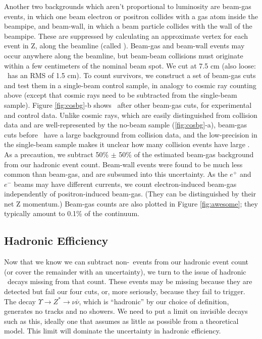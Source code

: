 \documentclass[aps,prd,preprint,superscriptaddress,tightenlines,nofootinbib,floatfix]{revtex4}
\begin{document}
Another two backgrounds which aren't proportional to luminosity are
beam-gas events, in which one beam electron or positron collides with
a gas atom inside the beampipe, and beam-wall, in which a beam
particle collides with the wall of the beampipe.  These are suppressed
by calculating an approximate vertex for each event in Z, along the
beamline (called \dz).  Beam-gas and beam-wall events may occur
anywhere along the beamline, but beam-beam collisions must originate
within a few centimeters of the nominal beam spot.  We cut at 7.5 cm
(also loose: \dz\ has an RMS of 1.5 cm).  To count survivors, we
construct a set of beam-gas cuts and test them in a single-beam
control sample, in analogy to cosmic ray counting above (except that
cosmic rays need to be subtracted from the single-beam sample).
Figure \ref{fig:cosbg}-b shows \dz\ after other beam-gas cuts, for
experimental and control data.  Unlike cosmic rays, which are easily
distinguished from collision data and are well-represented by the
no-beam sample (\ref{fig:cosbg}-a), beam-gas cuts before \dz\ have a
large background from collision data, and the low-precision in the
single-beam sample makes it unclear how many collision events have
large \dz.  As a precaution, we subtract 50\% $\pm$ 50\% of the
estimated beam-gas background from our hadronic event count.
Beam-wall events were found to be much less common than beam-gas, and
are subsumed into this uncertainty.  As the $e^+$ and $e^-$ beams may
have different currents, we count electron-induced beam-gas
independently of positron-induced beam-gas.  (They can be
distinguished by their net Z momentum.)  Beam-gas counts are also
plotted in Figure \ref{fig:awesome}; they typically amount to 0.1\% of
the continuum.

%
\subsection{Hadronic Efficiency}
%

Now that we know we can subtract non-\ups\ events from our hadronic
event count (or cover the remainder with an uncertainty), we turn to
the issue of hadronic \ups\ decays missing from that count.  These
events may be missing because they are detected but fail our four
cuts, or, more seriously, because they fail to trigger.  The decay
$\Upsilon \to Z^* \to \nu\bar{\nu}$, which is ``hadronic'' by our
choice of definition, generates no tracks and no showers.  We need to
put a limit on invisible decays such as this, ideally one that assumes
as little as possible from a theoretical model.  This limit will
dominate the uncertainty in hadronic efficiency.
\end{document}
